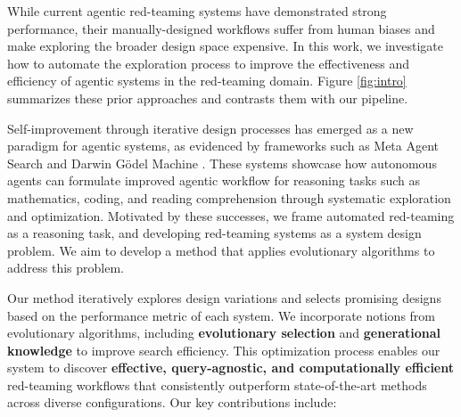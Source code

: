 While current agentic red-teaming systems have demonstrated strong performance, their manually-designed workflows suffer from human biases and make exploring the broader design space expensive. In this work, we investigate how to automate the exploration process to improve the effectiveness and efficiency of agentic systems in the red-teaming domain. Figure \ref{fig:intro} summarizes these prior approaches and contrasts them with our pipeline.

Self-improvement through iterative design processes has emerged as a new paradigm for agentic systems, as evidenced by frameworks such as Meta Agent Search \citep{hu2025automateddesignagenticsystems} and Darwin Gödel Machine \citep{zhang2025darwingodelmachineopenended}. These systems showcase how autonomous agents can formulate improved agentic workflow for reasoning tasks such as mathematics, coding, and reading comprehension through systematic exploration and optimization. Motivated by these successes, we frame automated red-teaming as a reasoning task, and developing red-teaming systems as a system design problem. We aim to develop a method that applies evolutionary algorithms to address this problem.

Our method iteratively explores design variations and selects promising designs based on the performance metric of each system. %
We incorporate notions from evolutionary algorithms, including \textbf{evolutionary selection} and \textbf{generational knowledge} to improve search efficiency. This optimization process enables our system to discover \textbf{effective, query-agnostic, and computationally efficient} red-teaming workflows that consistently outperform state-of-the-art methods across diverse configurations. 
Our key contributions include:


